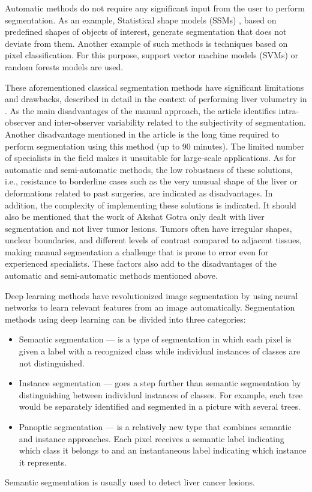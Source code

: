 Automatic methods do not require any significant input from the user to perform segmentation. As an example, Statistical shape models (SSMs) \cite{heimann_statistical_2009}, based on predefined shapes of objects of interest, generate segmentation that does not deviate from them. Another example of such methods is techniques based on pixel classification. For this purpose, support vector machine models (SVMs) \cite{jie_lu_automatic_2012} or random forests models \cite{hadjiiski_3d_2015} are used. 




These aforementioned classical segmentation methods have significant limitations and drawbacks, described in detail in the context of performing liver volumetry in \cite{gotra_liver_2017}. As the main disadvantages of the manual approach, the article identifies intra-observer and inter-observer variability related to the subjectivity of segmentation. Another disadvantage mentioned in the article is the long time required to perform segmentation using this method (up to 90 minutes). The limited number of specialists in the field makes it unsuitable for large-scale applications. As for automatic and semi-automatic methods, the low robustness of these solutions, i.e., resistance to borderline cases such as the very unusual shape of the liver or deformations related to past surgeries, are indicated as disadvantages. In addition, the complexity of implementing these solutions is indicated. It should also be mentioned that the work of Akshat Gotra \cite{gotra_liver_2017} only dealt with liver segmentation and not liver tumor lesions. Tumors often have irregular shapes, unclear boundaries, and different levels of contrast compared to adjacent tissues, making manual segmentation a challenge that is prone to error even for experienced specialists. These factors also add to the disadvantages of the automatic and semi-automatic methods mentioned above.

Deep learning methods have revolutionized image segmentation by using neural networks to learn relevant features from an image automatically. Segmentation methods using deep learning can be divided into three categories:
\begin{itemize}
    \item Semantic segmentation --- is a type of segmentation in which each pixel is given a label with  a recognized class while individual instances of classes are not distinguished.
    \item Instance segmentation --- goes a step further than semantic segmentation by distinguishing between individual instances of classes. For example, each tree would be separately identified and segmented in a picture with several trees.
    \item Panoptic segmentation \cite{kirillov_panoptic_2019} --- is a relatively new type that combines semantic and instance approaches. Each pixel receives a semantic label indicating which class it belongs to and an instantaneous label indicating which instance it represents.
\end{itemize}
Semantic segmentation is usually used to detect liver cancer lesions.

